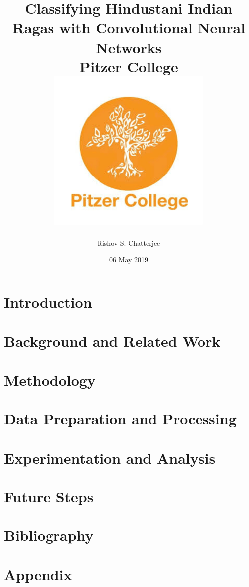 \documentclass[12pt]{report}
\title{
{Classifying Hindustani Indian Ragas with Convolutional Neural Networks}\\
{\large Pitzer College}\\
{\includegraphics{university_1.png}}
}
\author{Rishov S. Chatterjee}
\date{06 May 2019}
\begin{document}
\maketitle{}
\chapter*{\centering Introduction}


\chapter*{\centering Background and Related Work}


\chapter*{\centering Methodology}


\chapter*{\centering Data Preparation and Processing}


\chapter*{\centering Experimentation and Analysis}


\chapter*{\centering Future Steps}


\chapter*{\centering Bibliography}


\chapter*{\centering Appendix}

\end{document}
